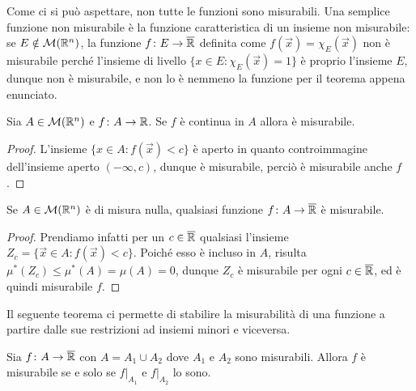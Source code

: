 Come ci si può aspettare, non tutte le funzioni sono misurabili.
Una semplice funzione non misurabile è la funzione caratteristica di un insieme non misurabile: se $E\notin\mathcal M(\mathbb{R}^n)$, la funzione $f\colon E\to\overline{\mathbb{R}}$ definita come $f(\vec x)=\chi_E(\vec x)$ non è misurabile perch\'e l'insieme di livello $\{x\in E\colon \chi_E(\vec x)=1\}$ è proprio l'insieme $E$, dunque non è misurabile, e non lo è nemmeno la funzione per il teorema appena enunciato.

\begin{teorema} \label{t:funzioni-continue-misurabili}
	Sia $A\in\mathcal M(\mathbb{R}^n)$ e $f\colon A\to\mathbb{R}$.
	Se $f$ è continua in $A$ allora è misurabile.
\end{teorema}
\begin{proof}
	L'insieme $\{x\in A\colon f(\vec x)<c\}$ è aperto in quanto controimmagine dell'insieme aperto $(-\infty,c)$, dunque è misurabile, perciò è misurabile anche $f$.
\end{proof}
\begin{osservazione} \label{o:funzione-misurabile-su-insieme-nullo}
	Se $A\in\mathcal M(\mathbb{R}^n)$ è di misura nulla, qualsiasi funzione $f\colon A\to\overline{\mathbb{R}}$ è misurabile.
\end{osservazione}
\begin{proof}
	Prendiamo infatti per un $c\in\overline{\mathbb{R}}$ qualsiasi l'insieme $Z_c=\{\vec x\in A\colon f(\vec x)<c\}$.
	Poich\'e esso è incluso in $A$, risulta $\mu^*(Z_c)\leq\mu^*(A)=\mu(A)=0$, dunque $Z_c$ è misurabile per ogni $c\in\overline{\mathbb{R}}$, ed è quindi misurabile $f$.
\end{proof}
Il seguente teorema ci permette di stabilire la misurabilità di una funzione a partire dalle sue restrizioni ad insiemi minori e viceversa.
\begin{teorema} \label{t:funzione-misurabile-restrizioni}
	Sia $f\colon A\to\overline{\mathbb{R}}$ con $A=A_1\cup A_2$ dove $A_1$ e $A_2$ sono misurabili.
	Allora $f$ è misurabile se e solo se $f|_{A_1}$ e $f|_{A_2}$ lo sono.
\end{teorema}
